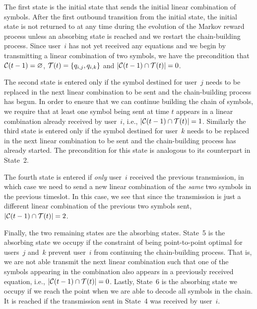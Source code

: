 

The first state is the initial state that sends the initial linear combination of symbols.  After the first outbound transition from the initial state, the initial state is not returned to at any time during the evolution of the Markov reward process unless an absorbing state is reached and we restart the chain-building process.  Since user~$i$ has not yet received any equations and we begin by transmitting a linear combination of two symbols, we have the precondition that $\mathcal{C}(t-1) = \varnothing$, $\mathcal{T}(t) = \{q_{i, j}, q_{i, k}\}$ and $|\mathcal{C}(t-1) \cap \mathcal{T}(t)| = 0$.

The second state is entered only if the symbol destined for user~$j$ needs to be replaced in the next linear combination to be sent and the chain-building process has begun.  In order to ensure that we can continue building the chain of symbols, we require that at least one symbol being sent at time $t$ appears in a linear combination already received by user~$i$, i.e.,  $|\mathcal{C}(t-1) \cap \mathcal{T}(t)| = 1$.  Similarly the third state is entered only if the symbol destined for user~$k$ needs to be replaced in the next linear combination to be sent and the chain-building process has already started.  The precondition for this state is analogous to its counterpart in State~2.  

The fourth state is entered if \emph{only} user~$i$ received the previous transmission, in which case we need to send a new linear combination of the \emph{same} two symbols in the previous timeslot.  In this case, we see that since the transmission is just a different linear combination of the previous two symbols sent, $|\mathcal{C}(t-1) \cap \mathcal{T}(t)| = 2$.

Finally, the two remaining states are the absorbing states.  State~5 is the absorbing state we occupy if the constraint of being point-to-point optimal for users~$j$ and~$k$ prevent user~$i$ from continuing the chain-building process.  That is, we are not able transmit the next linear combination such that one of the symbols appearing in the combination also appears in a previously received equation, i.e., $|\mathcal{C}(t-1) \cap \mathcal{T}(t)| = 0$.  Lastly, State~6 is the absorbing state we occupy if we reach the point when we are able to decode all symbols in the chain.  It is reached if the transmission sent in State~4 was received by user~$i$.

